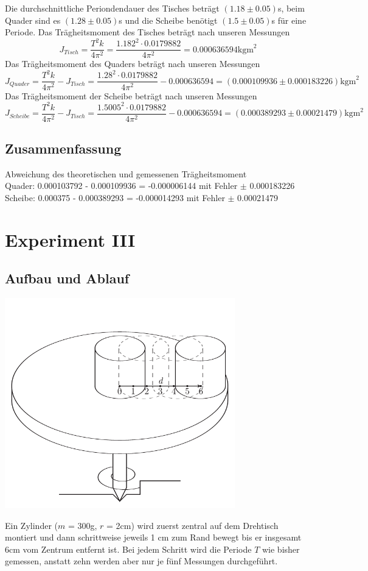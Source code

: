 \documentclass[12pt,a4paper]{article}
\begin{document}
Die durchschnittliche Periondendauer des Tisches betr\"agt $(1.18 \pm 0.05) $s, beim Quader sind es $(1.28 \pm 0.05)$s und die Scheibe ben\"otigt $(1.5 \pm 0.05)$s f\"ur eine Periode.
Das Tr\"agheitsmoment des Tisches betr\"agt nach unseren Messungen
\[ J_{Tisch} = \frac{T^2k}{4\pi^2} = \frac{1.182^2 \cdot 0.0179882}{4\pi^2} = 0.000636594 \mbox{kgm}^2\]
Das Tr\"agheitsmoment des Quaders betr\"agt nach unseren Messungen
\[ J_{Quader} = \frac{T^2k}{4\pi^2} - J_{Tisch} = \frac{1.28^2 \cdot 0.0179882}{4\pi^2} - 0.000636594 = (0.000109936 \pm 0.000183226) \mbox{kgm}^2 \]
Das Tr\"agheitsmoment der Scheibe betr\"agt nach unseren Messungen
\[ J_{Scheibe} = \frac{T^2k}{4\pi^2} - J_{Tisch} = \frac{1.5005^2 \cdot 0.0179882}{4\pi^2} - 0.000636594 = (0.000389293 \pm 0.00021479)  \mbox{kgm}^2 \]

\subsection*{Zusammenfassung}
Abweichung des theoretischen und gemessenen Tr\"agheitsmoment \\
Quader: 0.000103792 - 0.000109936 = -0.000006144  mit Fehler $\pm$ 0.000183226 \\
Scheibe: 0.000375 - 0.000389293 = -0.000014293 mit Fehler $\pm$ 0.00021479

\section*{Experiment III}
\subsection*{Aufbau und Ablauf}

\begin{center}
\includegraphics[width=10cm]{illustration3.pdf}
\end{center}
Ein Zylinder ($m$ = 300g, $r$ = 2cm) wird zuerst zentral auf dem Drehtisch montiert und dann schrittweise jeweils 1 cm zum Rand bewegt bis er insgesamt 6cm vom Zentrum entfernt ist. Bei jedem Schritt wird die Periode $T$ wie bisher gemessen, anstatt zehn werden aber nur je f\"unf Messungen durchgef\"uhrt.
\end{document}
